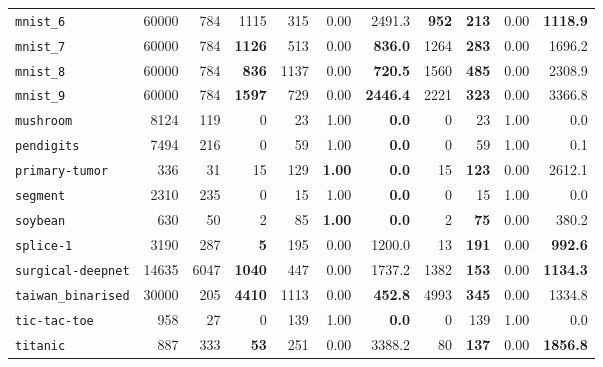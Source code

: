 \begin{tabular}{lccrrrrrrrr}
\texttt{mnist\_6} & \multicolumn{1}{r}{60000} & \multicolumn{1}{r}{784}  & 1115 & 315 & 0.00 & 2491.3 & \textbf{952} & \textbf{213} & 0.00 & \textbf{1118.9}\\
\texttt{mnist\_7} & \multicolumn{1}{r}{60000} & \multicolumn{1}{r}{784}  & \textbf{1126} & 513 & 0.00 & \textbf{836.0} & 1264 & \textbf{283} & 0.00 & 1696.2\\
\texttt{mnist\_8} & \multicolumn{1}{r}{60000} & \multicolumn{1}{r}{784}  & \textbf{836} & 1137 & 0.00 & \textbf{720.5} & 1560 & \textbf{485} & 0.00 & 2308.9\\
\texttt{mnist\_9} & \multicolumn{1}{r}{60000} & \multicolumn{1}{r}{784}  & \textbf{1597} & 729 & 0.00 & \textbf{2446.4} & 2221 & \textbf{323} & 0.00 & 3366.8\\
\texttt{mushroom} & \multicolumn{1}{r}{8124} & \multicolumn{1}{r}{119}  & 0 & 23 & 1.00 & \textbf{0.0} & 0 & 23 & 1.00 & 0.0\\
\texttt{pendigits} & \multicolumn{1}{r}{7494} & \multicolumn{1}{r}{216}  & 0 & 59 & 1.00 & \textbf{0.0} & 0 & 59 & 1.00 & 0.1\\
\texttt{primary-tumor} & \multicolumn{1}{r}{336} & \multicolumn{1}{r}{31}  & 15 & 129 & \textbf{1.00} & \textbf{0.0} & 15 & \textbf{123} & 0.00 & 2612.1\\
\texttt{segment} & \multicolumn{1}{r}{2310} & \multicolumn{1}{r}{235}  & 0 & 15 & 1.00 & \textbf{0.0} & 0 & 15 & 1.00 & 0.0\\
\texttt{soybean} & \multicolumn{1}{r}{630} & \multicolumn{1}{r}{50}  & 2 & 85 & \textbf{1.00} & \textbf{0.0} & 2 & \textbf{75} & 0.00 & 380.2\\
\texttt{splice-1} & \multicolumn{1}{r}{3190} & \multicolumn{1}{r}{287}  & \textbf{5} & 195 & 0.00 & 1200.0 & 13 & \textbf{191} & 0.00 & \textbf{992.6}\\
\texttt{surgical-deepnet} & \multicolumn{1}{r}{14635} & \multicolumn{1}{r}{6047}  & \textbf{1040} & 447 & 0.00 & 1737.2 & 1382 & \textbf{153} & 0.00 & \textbf{1134.3}\\
\texttt{taiwan\_binarised} & \multicolumn{1}{r}{30000} & \multicolumn{1}{r}{205}  & \textbf{4410} & 1113 & 0.00 & \textbf{452.8} & 4993 & \textbf{345} & 0.00 & 1334.8\\
\texttt{tic-tac-toe} & \multicolumn{1}{r}{958} & \multicolumn{1}{r}{27}  & 0 & 139 & 1.00 & \textbf{0.0} & 0 & 139 & 1.00 & 0.0\\
\texttt{titanic} & \multicolumn{1}{r}{887} & \multicolumn{1}{r}{333}  & \textbf{53} & 251 & 0.00 & 3388.2 & 80 & \textbf{137} & 0.00 & \textbf{1856.8}\\

\end{tabular}
